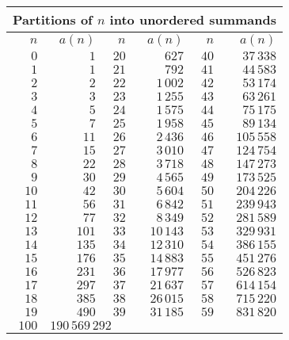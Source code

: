 \begin{center}
\begin{tabular}{|r|r|r|r|r|r|}
\hline
\multicolumn{6}{|l|}{Partitions of $n$ into unordered summands} \\
\hline
$n$ & $a(n)$ & $n$ & $a(n)$ & $n$ & $a(n)$ \\
\hline
$0$ & $1$ & $20$ & $627$ & $40$ & $37\,338$ \\
\hline
$1$ & $1$ & $21$ & $792$ & $41$ & $44\,583$ \\
\hline
$2$ & $2$ & $22$ & $1\,002$ & $42$ & $53\,174$ \\
\hline
$3$ & $3$ & $23$ & $1\,255$ & $43$ & $63\,261$ \\
\hline
$4$ & $5$ & $24$ & $1\,575$ & $44$ & $75\,175$ \\
\hline
$5$ & $7$ & $25$ & $1\,958$ & $45$ & $89\,134$ \\
\hline
$6$ & $11$ & $26$ & $2\,436$ & $46$ & $105\,558$ \\
\hline
$7$ & $15$ & $27$ & $3\,010$ & $47$ & $124\,754$ \\
\hline
$8$ & $22$ & $28$ & $3\,718$ & $48$ & $147\,273$ \\
\hline
$9$ & $30$ & $29$ & $4\,565$ & $49$ & $173\,525$ \\
\hline
$10$ & $42$ & $30$ & $5\,604$ & $50$ & $204\,226$ \\
\hline
$11$ & $56$ & $31$ & $6\,842$ & $51$ & $239\,943$ \\
\hline
$12$ & $77$ & $32$ & $8\,349$ & $52$ & $281\,589$ \\
\hline
$13$ & $101$ & $33$ & $10\,143$ & $53$ & $329\,931$ \\
\hline
$14$ & $135$ & $34$ & $12\,310$ & $54$ & $386\,155$ \\
\hline
$15$ & $176$ & $35$ & $14\,883$ & $55$ & $451\,276$ \\
\hline
$16$ & $231$ & $36$ & $17\,977$ & $56$ & $526\,823$ \\
\hline
$17$ & $297$ & $37$ & $21\,637$ & $57$ & $614\,154$ \\
\hline
$18$ & $385$ & $38$ & $26\,015$ & $58$ & $715\,220$ \\
\hline
$19$ & $490$ & $39$ & $31\,185$ & $59$ & $831\,820$ \\
\hline
$100$ & \multicolumn{5}{|l|}{$190\,569\,292$} \\
\hline
\end{tabular}
\end{center}